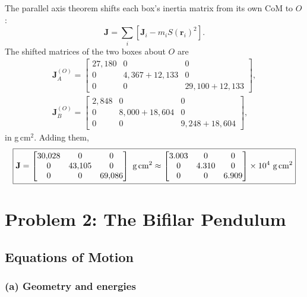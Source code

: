 \documentclass[11pt,letterpaper]{article}
\begin{document}
The parallel axis theorem shifts each box's inertia matrix from its own CoM to $O$:
\[
\mathbf{J} = \sum_{i}\left[ \mathbf{J}_i - m_i S(\mathbf{r}_i)^2 \right].
\]
The shifted matrices of the two boxes about $O$ are
\begin{gather*}
\mathbf{J}_A^{(O)} = \begin{bmatrix} 27{,}180 & 0 & 0 \\ 0 & 4{,}367 + 12{,}133 & 0 \\ 0 & 0 & 29{,}100 + 12{,}133 \end{bmatrix},
\\[4pt]
\mathbf{J}_B^{(O)} = \begin{bmatrix} 2{,}848 & 0 & 0 \\ 0 & 8{,}000 + 18{,}604 & 0 \\ 0 & 0 & 9{,}248 + 18{,}604 \end{bmatrix},
\end{gather*}
in g\,cm$^2$. Adding them,
\[
\boxed{\mathbf{J} = \begin{bmatrix} 30{,}028 & 0 & 0 \\ 0 & 43{,}105 & 0 \\ 0 & 0 & 69{,}086 \end{bmatrix}~\text{g\,cm}^2
\approx \begin{bmatrix} 3.003 & 0 & 0 \\ 0 & 4.310 & 0 \\ 0 & 0 & 6.909 \end{bmatrix}\times10^4~\text{g\,cm}^2}
\]

\section*{Problem 2: The Bifilar Pendulum}

\subsection*{Equations of Motion}

\subsubsection*{(a) Geometry and energies}
\end{document}
